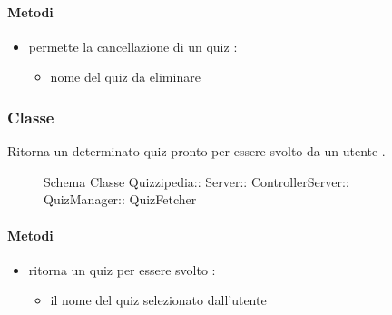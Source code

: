 \paragraph{Metodi}
\begin{itemize}
\item {}
\newline
permette la cancellazione di un quiz
\newline
{} :
\begin{itemize}
\item {}
\newline
nome del quiz da eliminare
\end{itemize}
\end{itemize}
\subsubsection{Classe }
Ritorna un determinato quiz pronto per essere svolto da un utente .
\begin{figure}[H]
\centering
\noindent{}
\caption[Schema Classe QuizFetcher]{Schema Classe Quizzipedia:: Server:: ControllerServer:: QuizManager:: QuizFetcher}
\end{figure}
\paragraph{Metodi}
\begin{itemize}
\item {}
\newline
ritorna un quiz per essere svolto
\newline
{} :
\begin{itemize}
\item {}
\newline
il nome del quiz selezionato dall'utente
\end{itemize}
\end{itemize}
